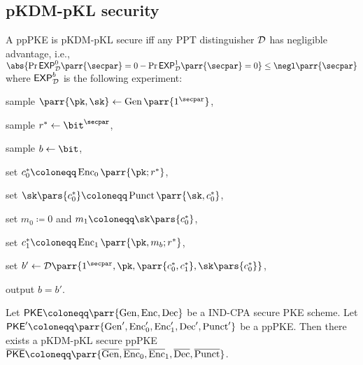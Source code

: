 \subsection{pKDM-pKL security}

\begin{definition}
    A ppPKE is pKDM-pKL secure iff any PPT distinguisher \(\mathcal{D}\) has negligible advantage, i.e., \(\abs{\Pr{\mathsf{EXP}^0_\D\parr{\secpar} = 0} - \Pr{\mathsf{EXP}^1_\D\parr{\secpar} = 0}} \leq \negl\parr{\secpar}\) where \(\mathsf{EXP}^b_{\mathcal{D}}\) is the following experiment:
    \begin{sitemize}
        \item sample \(\parr{\pk,\sk} \gets \Gen\parr{1^\secpar}\),
        \item sample \(r^* \gets \bit^\secpar\),
        \item sample \(b \gets \bit\),
        \item set \(c_0^* \coloneqq \Enc_0\parr{\pk;r^*}\),
        \item set \(\sk\pars{c^*_0} \coloneqq \Punct\parr{\sk,c_0^*}\),
        \item set \(m_0 \coloneqq 0\) and \(m_1 \coloneqq \sk\pars{c^*_0}\),
        \item set \(c_1^* \coloneqq \Enc_1\parr{\pk,m_b;r^*}\),
        \item set \(b' \gets \D\parr{1^\secpar,\pk,\parr{c^*_0,c^*_1},\sk\pars{c^*_0}}\),
        \item output \(b = b'\).
    \end{sitemize}
\end{definition}

\begin{lemma}
    Let \(\PKE \coloneqq \parr{\Gen, \Enc, \Dec}\) be a IND-CPA secure PKE scheme.
    Let \(\PKE' \coloneqq \parr{\Gen', \Enc'_0, \Enc'_1, \Dec', \Punct'}\) be a ppPKE.
    Then there exists a pKDM-pKL secure ppPKE \(\overline{\PKE} \coloneqq \parr{\overline{\Gen}, \overline{\Enc}_0, \overline{\Enc}_1, \overline{\Dec}, \overline{\Punct}}\).
\end{lemma}

